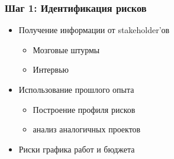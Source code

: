 \documentclass{../../slides-style}
\begin{document}
    \begin{frame}
        \frametitle{Шаг 1: Идентификация рисков}
        \begin{itemize}
            \item Получение информации от stakeholder’ов
            \begin{itemize}
                \item Мозговые штурмы
                \item Интервью
            \end{itemize}
            \item Использование прошлого опыта
            \begin{itemize}
                \item Построение профиля рисков
                \item анализ аналогичных проектов
            \end{itemize}
            \item Риски графика работ и бюджета
        \end{itemize}
    \end{frame}
\end{document}
